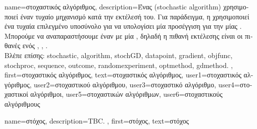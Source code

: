 {name={\foreignlanguage{greek}{στοχαστικός αλγόριθμος}}, 
	description={\foreignlanguage{greek}{Ένας}   
		(stochastic algorithm) \foreignlanguage{greek}{χρησιμοποι\-εί έναν τυχαίο μηχανισμό κατά την εκτέλεσή του. Για παράδειγμα, η} 
		 \foreignlanguage{greek}{χρησιμοποιεί ένα τυχαία επιλεγμένο υποσύνολο}   
		\foreignlanguage{greek}{για να υπολογίσει μία προσέγγιση για την}  \foreignlanguage{greek}{μίας} . 
		\foreignlanguage{greek}{Μπορούμε να αναπαραστήσουμε έναν}   \foreignlanguage{greek}{με 
		μία} , \foreignlanguage{greek}{δηλαδή η πιθανή}  \foreignlanguage{greek}{εκτέλεσης είναι οι 
		πιθανές}  \foreignlanguage{greek}{ενός}  
		\cite{BertsekasProb}, \cite{RandomizedAlgos}, \cite{Gallager13}. 
		\\ 
		\foreignlanguage{greek}{Βλέπε επίσης:} \gls{stochastic}, \gls{algorithm}, \gls{stochGD}, \gls{datapoint}, \gls{gradient}, \gls{objfunc}, \gls{stochproc}, 
		\gls{sequence}, \gls{outcome}, \gls{randomexperiment}, \gls{optmethod}, \gls{gdmethod}. },
	first={\foreignlanguage{greek}{στοχαστικός αλγόριθμος}},
	text={\foreignlanguage{greek}{στοχαστικός αλγόριθμος}},
	user1={\foreignlanguage{greek}{στοχαστικός αλγόριθμος}}, %
	user2={\foreignlanguage{greek}{στοχαστικού αλγόριθμου}}, %
	user3={\foreignlanguage{greek}{στοχαστικό αλγόριθμο}}, %
	user4={\foreignlanguage{greek}{στοχαστικοί αλγόριθμοι}}, %
	user5={\foreignlanguage{greek}{στοχαστικών αλγόριθμων}}, %
	user6={\foreignlanguage{greek}{στοχαστικούς αλγόριθμους}} %
}

{name={\foreignlanguage{greek}{στόχος}},
	description={TBC. },  
 	first={\foreignlanguage{greek}{στόχος}}, 
 	text={\foreignlanguage{greek}{στόχος}}
}

